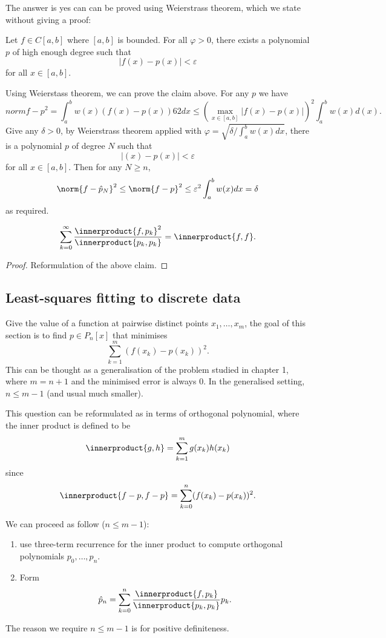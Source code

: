 \documentclass[a4paper]{article}
\newcommand*{\inner}{\innerproduct}
\begin{document}
The answer is yes can can be proved using Weierstrass theorem, which we state without giving a proof:

\begin{theorem}[Weierstrass]
  Let \(f \in C[a, b]\) where \([a, b]\) is bounded. For all \(\varphi > 0\), there exists a polynomial \(p\) of high enough degree such that
  \[
    |f(x) - p(x)| < \varepsilon
  \]
  for all \(x \in [a, b]\).
\end{theorem}

Using Weierstass theorem, we can prove the claim above. For any \(p\) we have
\[
  norm{f - p}^2 = \int_a^b w(x)(f(x) - p(x))62 dx \leq \left(\max_{x \in [a, b]} |f(x) - p(x)| \right)^2 \int_a^b w(x) d(x).
\]
Give any \(\delta > 0\), by Weierstrass theorem applied with \(\varphi = \sqrt{\delta/\int_a^b w(x) dx}\), there is a polynomial \(p\) of degree \(N\) such that
\[
  |(x) - p(x)| < \varepsilon
\]
for all \(x \in [a, b]\). Then for any \(N \geq n\),
\[
  \norm{f - \hat p_N}^2 \leq \norm{f - p}^2 \leq \varepsilon^2 \int_a^b w(x) dx = \delta
\]
as required.

\begin{theorem}
  \[
    \sum_{k = 0}^\infty \frac{\inner{f, p_k}^2}{\inner{p_k, p_k}} = \inner{f, f}.
  \]
\end{theorem}

\begin{proof}
  Reformulation of the above claim.
\end{proof}

\subsection{Least-squares fitting to discrete data}

Give the value of a function at pairwise distinct points \(x_1, \dots, x_m\), the goal of this section is to find \(p \in P_n[x]\) that minimises
\[
  \sum_{k = 1}^m (f(x_k) - p(x_k))^2.
\]
This can be thought as a generalisation of the problem studied in chapter 1, where \(m = n + 1\) and the minimised error is always \(0\). In the generalised setting, \(n \leq m - 1\) (and usual much smaller).

This question can be reformulated as in terms of orthogonal polynomial, where the inner product is defined to be
\[
  \inner{g, h} = \sum_{k = 1}^m g(x_k)h(x_k)
\]
since
\[
  \inner{f - p, f - p} = \sum_{k = 0}^n (f(x_k) - p(x_k))^2.
\]

We can proceed as follow (\(n \leq m - 1\)):
\begin{enumerate}
\item use three-term recurrence for the inner product to compute orthogonal polynomials \(p_0, \dots, p_n\).
\item Form
  \[
    \hat p_n = \sum_{k = 0}^n \frac{\inner{f, p_k}}{\inner{p_k, p_k}}p_k.
  \]
\end{enumerate}
The reason we require \(n \leq m - 1\) is for positive definiteness.
\end{document}
